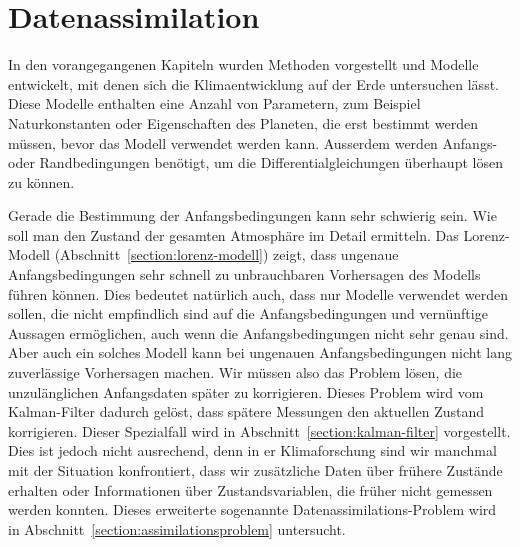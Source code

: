 %
%
%
\chapter{Datenassimilation}
In den vorangegangenen Kapiteln wurden Methoden vorgestellt
und Modelle entwickelt, mit denen sich die Klimaentwicklung auf der
Erde untersuchen lässt.
Diese Modelle enthalten eine Anzahl von Parametern, zum Beispiel
Naturkonstanten oder Eigenschaften des Planeten, die erst bestimmt
werden müssen, bevor das Modell verwendet werden kann.
Ausserdem werden Anfangs- oder Randbedingungen benötigt, um die
Differentialgleichungen überhaupt lösen zu können.

Gerade die Bestimmung der Anfangsbedingungen kann sehr schwierig sein.
Wie soll man den Zustand der gesamten Atmosphäre im Detail ermitteln.
Das Lorenz-Modell (Abschnitt~\ref{section:lorenz-modell}) zeigt, dass
ungenaue Anfangsbedingungen sehr schnell zu unbrauchbaren Vorhersagen
des Modells führen können.
Dies bedeutet natürlich auch, dass nur Modelle verwendet werden sollen,
die nicht empfindlich sind auf die Anfangsbedingungen und vernünftige
Aussagen ermöglichen, auch wenn die Anfangsbedingungen nicht sehr genau 
sind.
Aber auch ein solches Modell kann bei ungenauen Anfangsbedingungen 
nicht lang zuverlässige Vorhersagen machen.
Wir müssen also das Problem lösen, die unzulänglichen Anfangsdaten 
später zu korrigieren.
Dieses Problem wird vom Kalman-Filter dadurch gelöst, dass spätere
Messungen den aktuellen Zustand korrigieren.
Dieser Spezialfall wird in Abschnitt~\ref{section:kalman-filter}
vorgestellt.
Dies ist jedoch nicht ausrechend, denn in er Klimaforschung sind wir
manchmal mit der Situation konfrontiert, dass wir zusätzliche
Daten über frühere Zustände erhalten oder Informationen über Zustandsvariablen,
die früher nicht gemessen werden konnten.
Dieses erweiterte sogenannte Datenassimilations-Problem wird in
Abschnitt~\ref{section:assimilationsproblem} untersucht.







